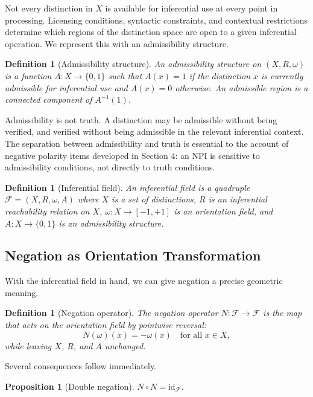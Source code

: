 \documentclass[12pt]{article}
\newtheorem{proposition}[theorem]{Proposition}
\newtheorem{definition}[theorem]{Definition}
\theoremstyle{remark}
\begin{document}
Not every distinction in $X$ is available for inferential use at every
point in processing. Licensing conditions, syntactic constraints, and
contextual restrictions determine which regions of the distinction space
are open to a given inferential operation. We represent this with an
admissibility structure.

\begin{definition}[Admissibility structure]
An \emph{admissibility structure} on $(X, R, \omega)$ is a function
$A : X \to \{0, 1\}$ such that $A(x) = 1$ if the distinction $x$ is
currently admissible for inferential use and $A(x) = 0$ otherwise. An
\emph{admissible region} is a connected component of $A^{-1}(1)$.
\end{definition}

Admissibility is not truth. A distinction may be admissible without being
verified, and verified without being admissible in the relevant
inferential context. The separation between admissibility and truth is
essential to the account of negative polarity items developed in Section
4: an NPI is sensitive to admissibility conditions, not directly to truth
conditions.

\begin{definition}[Inferential field]
An \emph{inferential field} is a quadruple $\mathcal{F} = (X, R, \omega,
A)$ where $X$ is a set of distinctions, $R$ is an inferential
reachability relation on $X$, $\omega : X \to [-1,+1]$ is an orientation
field, and $A : X \to \{0,1\}$ is an admissibility structure.
\end{definition}

\subsection{Negation as Orientation Transformation}

With the inferential field in hand, we can give negation a precise
geometric meaning.

\begin{definition}[Negation operator]
The \emph{negation operator} $N : \mathcal{F} \to \mathcal{F}$ is the
map that acts on the orientation field by pointwise reversal:
\[
N(\omega)(x) = -\omega(x) \quad \text{for all } x \in X,
\]
while leaving $X$, $R$, and $A$ unchanged.
\end{definition}
Several consequences follow immediately.

\begin{proposition}[Double negation]
\label{prop:double-neg}
$N \circ N = \mathrm{id}_{\mathcal{F}}$.
\end{proposition}
\end{document}
